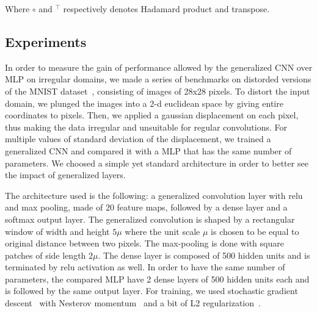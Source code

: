 Where $\circ$ and $^\top$ respectively denotes Hadamard product and transpose.

\subsection{Experiments}
\label{experiments}

In order to measure the gain of performance allowed by the generalized CNN over MLP  on irregular domains, we made a series of benchmarks on distorded versions of the MNIST dataset~\cite{lecun1998mnist}, consisting of images of 28x28 pixels. To distort the input domain, we plunged the images into a 2-d euclidean space by giving entire coordinates to pixels. Then, we applied a gaussian displacement on each pixel, thus making the data irregular and unsuitable for regular convolutions. For multiple values of standard deviation of the displacement, we trained a generalized CNN and compared it with a MLP that has the same number of parameters. We choosed a simple yet standard architecture in order to better see the impact of generalized layers.

The architecture used is the following: a generalized convolution layer with relu~\cite{glorot2011deep} and max pooling, made of 20 feature maps, followed by a dense layer and a softmax output layer. The generalized convolution is shaped by a rectangular window of width and height $5\mu$ where the unit scale $\mu$ is chosen to be equal to original distance between two pixels. The max-pooling is done with square patches of side length $2\mu$. The dense layer is composed of 500 hidden units and is terminated by relu activation as well. In order to have the same number of parameters, the compared MLP have 2 dense layers of 500 hidden units each and is followed by the same output layer. For training, we used stochastic gradient descent~\cite{bottou2010large} with Nesterov momentum~\cite{sutskever2013importance} and a bit of L2 regularization~\cite{ng2004feature}.%

